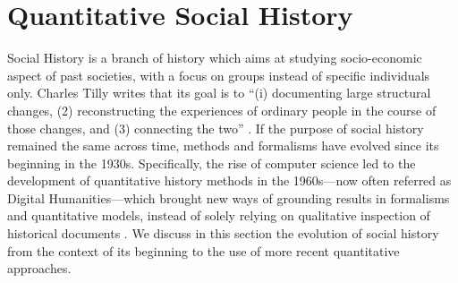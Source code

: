 


\section{Quantitative Social History}\label{sec:social-history}


Social History is a branch of history which aims at studying socio-economic aspect of past societies, with a focus on groups instead of specific individuals only.
Charles Tilly writes that its goal is to ``(i) documenting large structural changes, (2) reconstructing the experiences of ordinary people in the course of those changes, and (3) connecting the two'' \cite{tilly1984retrieving}.
If the purpose of social history remained the same across time, methods and formalisms have evolved since its beginning in the 1930s.
Specifically, the rise of computer science led to the development of quantitative history methods in the 1960s---now often referred as Digital Humanities---which brought new ways of grounding results in formalisms and quantitative models, instead of solely relying on qualitative inspection of historical documents \cite{haskinsUnderstandingQuantitativeHistory2011}.
We discuss in this section the evolution of social history from the context of its beginning to the use of more recent quantitative approaches.




